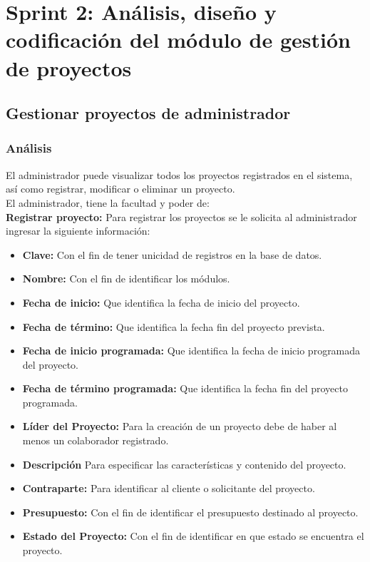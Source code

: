 \section{Sprint 2: Análisis, diseño y codificación del módulo de gestión de proyectos}
\subsection{Gestionar proyectos de administrador}
\subsubsection {Análisis}
El administrador puede visualizar todos los proyectos registrados en el sistema, así como registrar, modificar o eliminar un proyecto.\\

El administrador, tiene la facultad y poder de:\\

\textbf {Registrar proyecto:}
Para registrar los proyectos se le solicita al administrador ingresar la siguiente información:

\begin{itemize}
	\item \textbf{Clave:} Con el fin de tener unicidad de registros en la base de datos.
	\item \textbf{Nombre:} Con el fin de identificar los módulos.
	\item \textbf{Fecha de inicio:} Que identifica la fecha de inicio del proyecto.
	\item \textbf{Fecha de término:} Que identifica la fecha fin del proyecto prevista.
	\item \textbf{Fecha de inicio programada:} Que identifica la fecha de inicio programada del proyecto.
	\item \textbf{Fecha de término programada:} Que identifica la fecha fin del proyecto programada.
	\item \textbf{Líder del Proyecto:} Para la creación de un proyecto debe de haber al menos un colaborador registrado.
	\item \textbf{Descripción} Para especificar las características y contenido del proyecto.
	\item \textbf{Contraparte:} Para identificar al cliente o solicitante del proyecto.
	\item \textbf{Presupuesto:} Con el fin de identificar el presupuesto destinado al proyecto.
	\item \textbf{Estado del Proyecto:} Con el fin de identificar en que estado se encuentra el proyecto.
\end{itemize}

